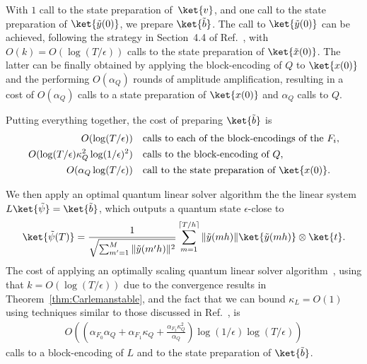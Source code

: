 \documentclass[superscriptaddress,onecolumn,nofootinbib,longbibliography,a4paper,accepted=2026-09-29]{quantumarticle}
\theoremstyle{plain}
\theoremstyle{definition}
\numberwithin{thm}{section}
\numberwithin{assumption}{section}
\numberwithin{lemma}{section}
\numberwithin{prop}{section}
\numberwithin{cor}{section}
\numberwithin{definition}{section}
\numberwithin{rmk}{section}
\numberwithin{equation}{section}
\begin{document}
With $1$ call to the state preparation of~$\ket{v}$, and one call to the state preparation of $\ket{\tilde{y}(0)}$, we prepare $\ket{\tilde{b}}$. The call to $\ket{\tilde{y}(0)}$ can be achieved, following the strategy in Section~4.4 of Ref.~\cite{liu2021efficient}, with $O(k) = O(\log(T/\epsilon))$ calls to the state preparation of $\ket{\tilde{x}(0)}$. The latter can be finally obtained by applying the block-encoding of $Q$ to $\ket{x(0)}$ and the performing $O(\alpha_Q)$ rounds of amplitude amplification, resulting in a cost of $O(\alpha_Q)$ calls to a state preparation of $\ket{x(0)}$ and $\alpha_Q$ calls to $Q$.

Putting everything together, the cost of preparing $\ket{\tilde{b}}$ is 
\begin{align}
O(\log(T/\epsilon)) & \quad \textrm{calls to each of the block-encodings of the } F_i, \\
O(\log(T/\epsilon) \kappa^2_Q \log(1/\epsilon)^2) & \quad  \textrm{calls to the block-encoding of } Q, \\
O(\alpha_Q \log(T/\epsilon)) & \quad \textrm{call to the state preparation of $\ket{x(0)}$}. 
\end{align}

We then apply an optimal quantum linear solver algorithm the the linear system $L \ket{\tilde{\psi}} = \ket{\tilde{b}}$, which outputs a quantum state $\epsilon$-close to
\begin{align}
\ket{\tilde{\psi}(T)} = \frac{1}{\sqrt{\sum_{m'=1}^M \| \tilde{y}(m'h)\|^2 }} \sum_{m=1}^{\lceil T/h \rceil } \| \tilde{y}(m h)\| \ket{\tilde{y}(mh)} \otimes \ket{t}.
    \end{align}
The cost of applying an optimally scaling quantum linear solver algorithm~\cite{costa2022optimal, dalzell2024shortcut, jennings2023efficient}, using that $k = O(\log(T/\epsilon))$ due to the convergence results in Theorem~\ref{thm:Carlemanstable}, and the fact that we can bound $\kappa_L = O(1)$ using techniques similar to those discussed in Ref.~\cite{an2024fast}, is
\begin{align}
    O\left((\alpha_{F_0} \alpha_Q + \alpha_{F_1} \kappa_Q + \frac{\alpha_{F_2} \kappa_Q^2}{\alpha_Q})\log(1/\epsilon)\log(T/\epsilon) \right) 
\end{align}
calls to a block-encoding of $L$ and to the state preparation of $\ket{\tilde{b}}$. 
\end{document}
